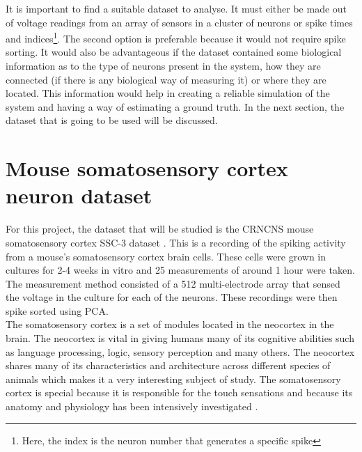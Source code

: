 It is important to find a suitable dataset to analyse. It must either be made out of voltage readings from an array of sensors in a cluster of neurons or spike times and indices\footnote{Here, the index is the neuron number that generates a specific spike}. The second option is preferable because it would not require spike sorting. It would also be advantageous if the dataset contained some biological information as to the type of neurons present in the system, how they are connected (if there is any biological way of measuring it) or where they are located. This information would help in creating a reliable simulation of the system and having a way of estimating a ground truth. In the next section, the dataset that is going to be used will be discussed. 

\section{Mouse somatosensory cortex neuron dataset}

For this project, the dataset that will be studied is the CRNCNS mouse somatosensory cortex SSC-3 dataset \cite{ito2016spontaneous, ito2014large, litke2004does}. This is a recording of the spiking activity from a mouse's somatosensory cortex brain cells. These cells were grown in cultures for 2-4 weeks in vitro and 25 measurements of around 1 hour were taken. The measurement method consisted of a 512 multi-electrode array	that sensed the voltage in the culture for each of the neurons. These recordings were then spike sorted using PCA. \\

The somatosensory cortex is a set of modules located in the neocortex in the brain. The neocortex is vital in giving humans many of its cognitive abilities such as language processing, logic, sensory perception and many others. The neocortex shares many of its characteristics and architecture across different species of animals which makes it a very interesting subject of study. The somatosensory cortex is special because it is responsible for the touch sensations and because its anatomy and physiology has been intensively investigated \cite{markram2015reconstruction}.\\

